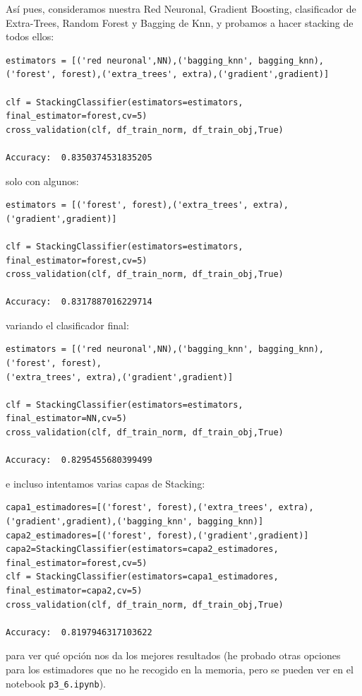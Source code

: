 \documentclass[a4paper,11pt]{article}
\begin{document}
Así pues, consideramos nuestra Red Neuronal, Gradient Boosting, clasificador de Extra-Trees, Random Forest y Bagging de Knn, y probamos a hacer stacking de todos ellos:
\begin{verbatim}
estimators = [('red neuronal',NN),('bagging_knn', bagging_knn),
('forest', forest),('extra_trees', extra),('gradient',gradient)]

clf = StackingClassifier(estimators=estimators, final_estimator=forest,cv=5)
cross_validation(clf, df_train_norm, df_train_obj,True)

Accuracy:  0.8350374531835205
\end{verbatim}

solo con algunos:
\begin{verbatim}
estimators = [('forest', forest),('extra_trees', extra),('gradient',gradient)]

clf = StackingClassifier(estimators=estimators, final_estimator=forest,cv=5)
cross_validation(clf, df_train_norm, df_train_obj,True)

Accuracy:  0.8317887016229714
\end{verbatim}
variando el clasificador final:

\begin{verbatim}
estimators = [('red neuronal',NN),('bagging_knn', bagging_knn),('forest', forest),
('extra_trees', extra),('gradient',gradient)]

clf = StackingClassifier(estimators=estimators, final_estimator=NN,cv=5)
cross_validation(clf, df_train_norm, df_train_obj,True)

Accuracy:  0.8295455680399499
\end{verbatim}

e incluso intentamos varias capas de Stacking:
 
 \begin{verbatim}
capa1_estimadores=[('forest', forest),('extra_trees', extra),
('gradient',gradient),('bagging_knn', bagging_knn)]
capa2_estimadores=[('forest', forest),('gradient',gradient)]
capa2=StackingClassifier(estimators=capa2_estimadores, final_estimator=forest,cv=5)
clf = StackingClassifier(estimators=capa1_estimadores, final_estimator=capa2,cv=5)
cross_validation(clf, df_train_norm, df_train_obj,True)

Accuracy:  0.8197946317103622
 \end{verbatim}

para ver qué opción nos da los mejores resultados (he probado otras opciones para los estimadores que no he recogido en la memoria, pero se pueden ver en el notebook \texttt{p3_6.ipynb}).
\end{document}
